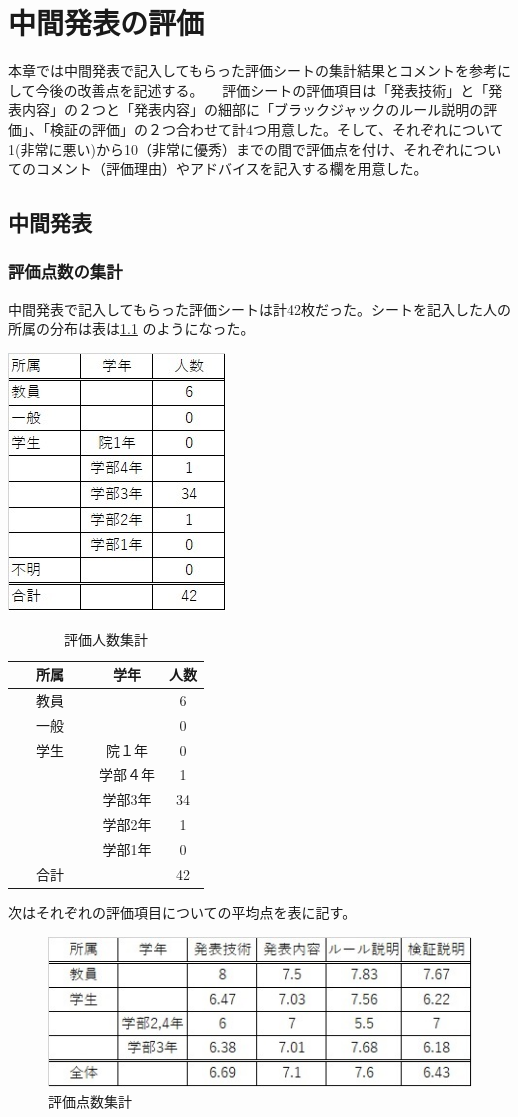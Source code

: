 \chapter{中間発表の評価}
 本章では中間発表で記入してもらった評価シートの集計結果とコメントを参考にして今後の改善点を記述する。
　評価シートの評価項目は「発表技術」と「発表内容」の２つと「発表内容」の細部に「ブラックジャックのルール説明の評価」、「検証の評価」の２つ合わせて計4つ用意した。そして、それぞれについて1(非常に悪い)から10（非常に優秀）までの間で評価点を付け、それぞれについてのコメント（評価理由）やアドバイスを記入する欄を用意した。
\section{中間発表}
\subsection{評価点数の集計}
中間発表で記入してもらった評価シートは計42枚だった。シートを記入した人の所属の分布は表は\ref{tab:dist} のようになった。
\begin{center}
\includegraphics[width=0.\linewidth]{./figure/hyou81.jpg}
\end{center}


\begin{table}[htb]
  \begin{center}
    \caption{評価人数集計}
    \begin{tabular}{|c|c|c|} \hline
      所属 & 学年 & 人数  \\ \hline 
      教員 &  & 6  \\
      一般 &  & 0 \\
      学生 & 院１年 & 0 \\
             & 学部４年 & 1 \\
 　　　　　 & 学部3年 & 34 \\
             & 学部2年 & 1 \\
             & 学部1年 & 0 \\
      合計 &  & 42 \\ \hline
    \end{tabular}
    \label{tab:dist}
  \end{center}
\end{table}
次はそれぞれの評価項目についての平均点を表に記す。
\begin{figure}
\begin{center}
\caption{評価点数集計}
\includegraphics[width=0.5\linewidth]{./figure/hyou82.jpg}
\end{center}
\end{figure}

